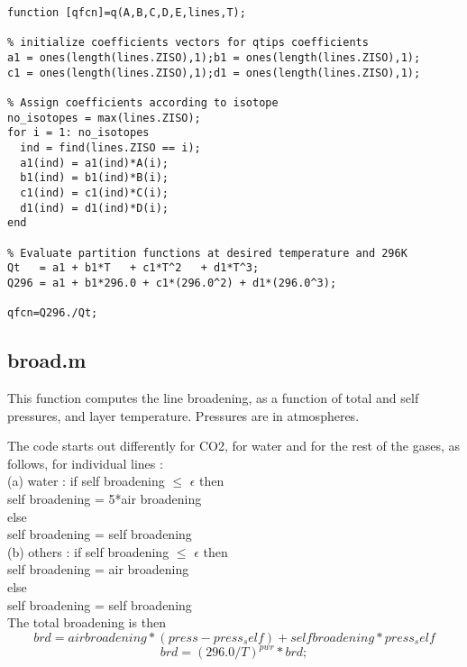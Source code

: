 \documentclass[11pt]{article}
\begin{document}
\begin{verbatim}
function [qfcn]=q(A,B,C,D,E,lines,T); 

% initialize coefficients vectors for qtips coefficients 
a1 = ones(length(lines.ZISO),1);b1 = ones(length(lines.ZISO),1); 
c1 = ones(length(lines.ZISO),1);d1 = ones(length(lines.ZISO),1); 

% Assign coefficients according to isotope 
no_isotopes = max(lines.ZISO); 
for i = 1: no_isotopes 
  ind = find(lines.ZISO == i); 
  a1(ind) = a1(ind)*A(i); 
  b1(ind) = b1(ind)*B(i); 
  c1(ind) = c1(ind)*C(i); 
  d1(ind) = d1(ind)*D(i); 
end 

% Evaluate partition functions at desired temperature and 296K 
Qt   = a1 + b1*T   + c1*T^2   + d1*T^3; 
Q296 = a1 + b1*296.0 + c1*(296.0^2) + d1*(296.0^3); 

qfcn=Q296./Qt;

\end{verbatim}

\subsection{broad.m}
This function computes the line broadening, as a function of total and self
pressures, and layer temperature. Pressures are in atmospheres.

The code starts out differently for CO2, for water and for the rest of the 
gases, as follows, for individual lines : \\
(a) water : if self broadening $ \le $ $ \epsilon $ then\\
              self broadening = 5*air broadening\\
            else\\
              self broadening = self broadening\\
(b) others : if self broadening $ \le $ $ \epsilon $ then\\
              self broadening = air broadening\\
            else\\
              self broadening = self broadening\\
The total broadening is then
\begin{displaymath}
  brd=air broadening*(press-press_self) + self broadening*press_self
\end{displaymath}
\begin{displaymath}
  brd=(296.0/T)^{pwr}*brd;
\end{displaymath}
\end{document}

